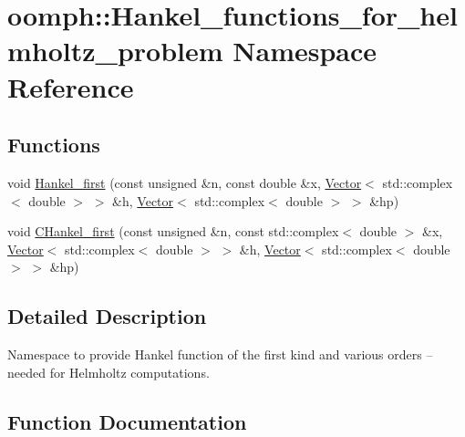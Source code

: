 \hypertarget{namespaceoomph_1_1Hankel__functions__for__helmholtz__problem}{}\section{oomph\+:\+:Hankel\+\_\+functions\+\_\+for\+\_\+helmholtz\+\_\+problem Namespace Reference}
\label{namespaceoomph_1_1Hankel__functions__for__helmholtz__problem}
\subsection*{Functions}
\begin{DoxyCompactItemize}
\item 
void \hyperlink{namespaceoomph_1_1Hankel__functions__for__helmholtz__problem_a89d572e5352a2da98d19260165385f6f}{Hankel\+\_\+first} (const unsigned \&n, const double \&x, \hyperlink{classoomph_1_1Vector}{Vector}$<$ std\+::complex$<$ double $>$ $>$ \&h, \hyperlink{classoomph_1_1Vector}{Vector}$<$ std\+::complex$<$ double $>$ $>$ \&hp)
\item 
void \hyperlink{namespaceoomph_1_1Hankel__functions__for__helmholtz__problem_a051f9376947b679c4c117f024fd7528a}{C\+Hankel\+\_\+first} (const unsigned \&n, const std\+::complex$<$ double $>$ \&x, \hyperlink{classoomph_1_1Vector}{Vector}$<$ std\+::complex$<$ double $>$ $>$ \&h, \hyperlink{classoomph_1_1Vector}{Vector}$<$ std\+::complex$<$ double $>$ $>$ \&hp)
\end{DoxyCompactItemize}


\subsection{Detailed Description}
Namespace to provide Hankel function of the first kind and various orders -- needed for Helmholtz computations. 

\subsection{Function Documentation}
\mbox{\label{namespaceoomph_1_1Hankel__functions__for__helmholtz__problem_a051f9376947b679c4c117f024fd7528a}} 
